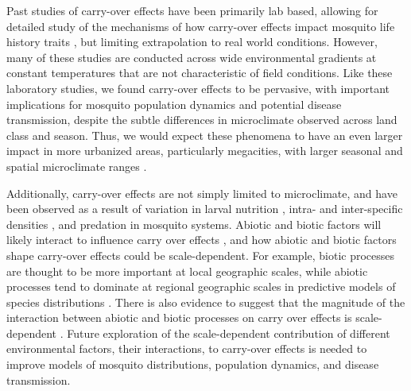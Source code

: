 \documentclass[12pt]{article}
\begin{document}
Past studies of carry-over effects have been primarily lab based, allowing for detailed study of the mechanisms of how carry-over effects impact mosquito life history traits \citep{alto2008, alto2005}, but limiting extrapolation to real world conditions. However, many of these studies are conducted across wide environmental gradients at constant temperatures that are not characteristic of field conditions. Like these laboratory studies, we found carry-over effects to be pervasive, with important implications for mosquito population dynamics and potential disease transmission, despite the subtle differences in microclimate observed across land class and season. Thus, we would expect these phenomena to have an even larger impact in more urbanized areas, particularly megacities, with larger seasonal and spatial microclimate ranges \citep{peng2012}. 


Additionally, carry-over effects are not simply limited to microclimate, and have been observed as a result of variation in larval nutrition \citep{moller-jacobs2014}, intra- and inter-specific densities \citep{reiskind2009a, alto2005, alto2008}, and predation \citep{roux2015a} in mosquito systems. Abiotic and biotic factors will likely interact to influence carry over effects \citep{buckner2016, muturi2011d, muturi2012a, muturi2011b, muturi2010}, and how abiotic and biotic factors shape carry-over effects could be scale-dependent. For example, biotic processes are thought to be more important at local geographic scales, while abiotic processes tend to dominate at regional geographic scales in predictive models of species distributions \citep{cohen2016}. There is also evidence to suggest that the magnitude of the interaction between abiotic and biotic processes on carry over effects is scale-dependent \citep{leisnham2014}. Future exploration of the scale-dependent contribution of different environmental factors, their interactions, to carry-over effects is needed to improve models of mosquito distributions, population dynamics, and disease transmission.

\end{document}
